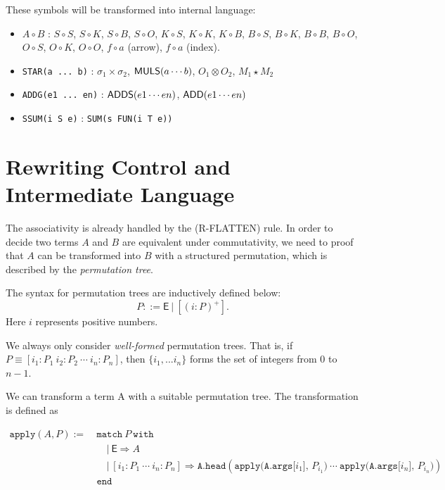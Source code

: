 \documentclass{article}
\begin{document}
These symbols will be transformed into internal language:
\begin{itemize}
    \item $A \circ B$ : $S \circ S$, $S \circ K$, $S \circ B$, $S \circ O$, $K \circ S$, $K \circ K$, $K \circ B$, $B \circ S$, $B \circ K$, $B \circ B$, $B \circ O$, $O \circ S$, $O \circ K$, $O \circ O$, $f\circ a$ (arrow), $f\circ a$ (index).
    \item \texttt{STAR(a ... b)} :  $\sigma_1 \times \sigma_2$, $\mathsf{MULS}(a \cdots b)$, $O_1 \otimes O_2$, $ M_1 \star M_2$
    \item \texttt{ADDG(e1 ... en)} : $\mathsf{ADDS}(e1 \cdots en)$, $\mathsf{ADD}(e1 \cdots en)$
    \item \texttt{SSUM(i S e)} : \texttt{SUM(s FUN(i T e))}
\end{itemize}




\section{Rewriting Control and Intermediate Language}
The associativity is already handled by the (R-FLATTEN) rule. In order to decide two terms $A$ and $B$ are equivalent under commutativity, we need to proof that $A$ can be transformed into $B$ with a structured permutation, which is described by the \textit{permutation tree}.

\begin{definition}
    The syntax for permutation trees are inductively defined below:
    \[
    P ::= \mathsf{E}\ |\ [(i:P)^+].
    \]
    Here $i$ represents positive numbers.
\end{definition}
We always only consider \textit{well-formed} permutation trees. That is, if $P \equiv [i_1:P_1\ i_2:P_2\ \cdots\ i_n:P_n]$, then $\{i_1, ... i_n\}$ forms the set of integers from $0$ to $n-1$.

We can transform a term A with a suitable permutation tree. The transformation is defined as

\begin{align*}
    \texttt{apply}(A, P) :=\ & \texttt{match}\ P\ \texttt{with} \\
    & \quad |\ \textsf{E} \Rightarrow A \\
    & \quad |\ [i_1:P_1\ \cdots\ i_n:P_n] \Rightarrow \texttt{A.head}(\texttt{apply(A.args[$i_1$], $P_{i_1}$)}\ \cdots\ \texttt{apply(A.args[$i_n$], $P_{i_n}$)}) \\
    & \texttt{end}
\end{align*}

\clearpage



\clearpage



\end{document}
